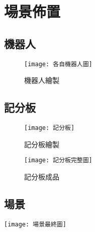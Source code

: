 \chapter{場景佈置}
\section{機器人}
\begin{figure}[hbt!]
\begin{center}
\label{各自機器人圖}
\texttt{[image: 各自機器人圖]}
\caption{\Large 機器人繪製}
\end{center}
\end{figure}
\newpage

\section{記分板}

\begin{figure}[hbt!]
  \centering
  \texttt{[image: 記分板]}
  \caption{\Large 記分板繪製}
  \label{fig:記分板}
\end{figure}

\begin{figure}[hbt!]
  \centering
  \texttt{[image: 記分板完整圖]}
  \caption{\Large 記分板成品}
  \label{fig:記分板完整圖}
\end{figure}

\section{場景}

\begin{minipage}{\textwidth}
  \centering
  \texttt{[image: 場景最終圖]}
  \label{場景最終圖}
\end{minipage}
\newpage
